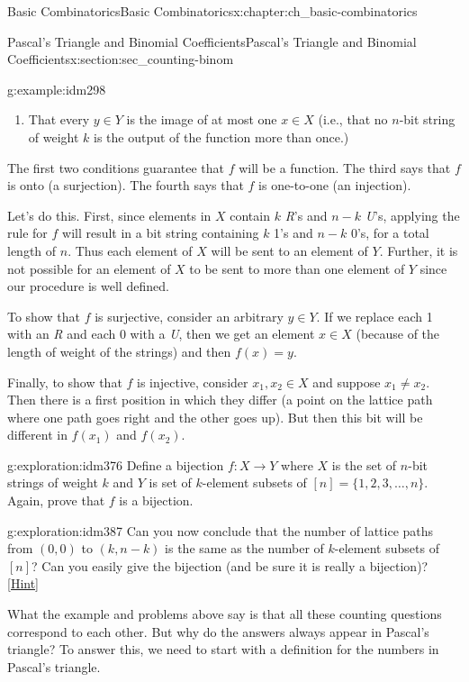 \documentclass[oneside,10pt,]{book}
\numberwithin{equation}{chapter}
\begin{document}
\begin{chapterptx}{Basic Combinatorics}{}{Basic Combinatorics}{}{}{x:chapter:ch_basic-combinatorics}
\begin{sectionptx}{Pascal's Triangle and Binomial Coefficients}{}{Pascal's Triangle and Binomial Coefficients}{}{}{x:section:sec_counting-binom}
\begin{example}{}{g:example:idm298}
\begin{enumerate}
\item{}That every \(y \in Y\) is the image of at most one \(x \in X\) (i.e., that no \(n\)-bit string of weight \(k\) is the output of the function more than once.)%
\end{enumerate}
The first two conditions guarantee that \(f\) will be a function.  The third says that \(f\) is onto (a surjection).  The fourth says that \(f\) is one-to-one (an injection).%
\par
Let's do this.  First, since elements in \(X\) contain \(k\) \emph{R}'s and \(n-k\) \emph{U}'s, applying the rule for \(f\) will result in a bit string containing \(k\) 1's and \(n-k\) 0's, for a total length of \(n\).  Thus each element of \(X\) will be sent to an element of \(Y\).  Further, it is not possible for an element of \(X\) to be sent to more than one element of \(Y\) since our procedure is well defined.%
\par
To show that \(f\) is surjective, consider an arbitrary \(y \in Y\).  If we replace each 1 with an \emph{R} and each 0 with a \emph{U}, then we get an element \(x \in X\) (because of the length of weight of the strings) and then \(f(x) = y\).%
\par
Finally, to show that \(f\) is injective, consider \(x_1, x_2 \in X\) and suppose \(x_1 \ne x_2\).  Then there is a first position in which they differ (a point on the lattice path where one path goes right and the other goes up).  But then this bit will be different in \(f(x_1)\) and \(f(x_2)\).%
\end{example}
\begin{exploration}{}{g:exploration:idm376}%
Define a bijection \(f:X \to Y\) where \(X\) is the set of \(n\)-bit strings of weight \(k\) and \(Y\) is set of \(k\)-element subsets of \([n] = \{1,2,3,\ldots, n\}\).  Again, prove that \(f\) is a bijection.%
\end{exploration}
\begin{exploration}{}{g:exploration:idm387}%
Can you now conclude that the number of lattice paths from \((0,0)\) to \((k,n-k)\) is the same as the number of \(k\)-element subsets of \([n]\)?  Can you easily give the bijection (and be sure it is really a bijection)?%
\space\hspace*{0pt}\hfill{\tiny\hyperlink{g:hint:idm394-back}{[Hint]}}\end{exploration}
What the example and problems above say is that all these counting questions correspond to each other.  But why do the answers always appear in Pascal's triangle?  To answer this, we need to start with a definition for the numbers in Pascal's triangle.%

\end{sectionptx}
\end{chapterptx}
\end{document}
